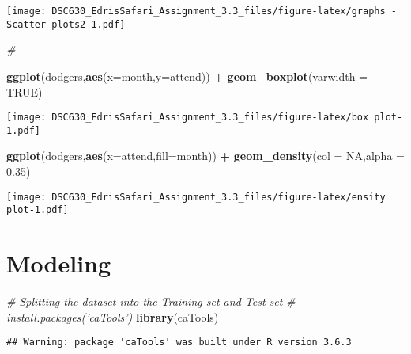 \documentclass[
]{article}
\newenvironment{Shaded}{\begin{snugshade}}{\end{snugshade}}
\newcommand{\CommentTok}[1]{\textcolor[rgb]{0.56,0.35,0.01}{\textit{#1}}}
\newcommand{\DataTypeTok}[1]{\textcolor[rgb]{0.13,0.29,0.53}{#1}}
\newcommand{\FloatTok}[1]{\textcolor[rgb]{0.00,0.00,0.81}{#1}}
\newcommand{\KeywordTok}[1]{\textcolor[rgb]{0.13,0.29,0.53}{\textbf{#1}}}
\newcommand{\NormalTok}[1]{#1}
\newcommand{\OperatorTok}[1]{\textcolor[rgb]{0.81,0.36,0.00}{\textbf{#1}}}
\newcommand{\OtherTok}[1]{\textcolor[rgb]{0.56,0.35,0.01}{#1}}
\newcommand{\StringTok}[1]{\textcolor[rgb]{0.31,0.60,0.02}{#1}}
\begin{document}
\texttt{[image: DSC630\_EdrisSafari\_Assignment\_3.3\_files/figure-latex/graphs - Scatter plots2-1.pdf]}

\begin{Shaded}
\begin{Highlighting}[]
\CommentTok{# }


\KeywordTok{ggplot}\NormalTok{(dodgers,}\KeywordTok{aes}\NormalTok{(}\DataTypeTok{x=}\NormalTok{month,}\DataTypeTok{y=}\NormalTok{attend)) }\OperatorTok{+}
\StringTok{  }\KeywordTok{geom_boxplot}\NormalTok{(}\DataTypeTok{varwidth =} \OtherTok{TRUE}\NormalTok{)}
\end{Highlighting}
\end{Shaded}

\texttt{[image: DSC630\_EdrisSafari\_Assignment\_3.3\_files/figure-latex/box plot-1.pdf]}

\begin{Shaded}
\begin{Highlighting}[]
\KeywordTok{ggplot}\NormalTok{(dodgers,}\KeywordTok{aes}\NormalTok{(}\DataTypeTok{x=}\NormalTok{attend,}\DataTypeTok{fill=}\NormalTok{month)) }\OperatorTok{+}
\StringTok{  }\KeywordTok{geom_density}\NormalTok{(}\DataTypeTok{col =} \OtherTok{NA}\NormalTok{,}\DataTypeTok{alpha =} \FloatTok{0.35}\NormalTok{)}
\end{Highlighting}
\end{Shaded}

\texttt{[image: DSC630\_EdrisSafari\_Assignment\_3.3\_files/figure-latex/ensity plot-1.pdf]}

\hypertarget{modeling}{%
\section{Modeling}\label{modeling}}

\begin{Shaded}
\begin{Highlighting}[]
\CommentTok{# Splitting the dataset into the Training set and Test set}
\CommentTok{# install.packages('caTools')}
\KeywordTok{library}\NormalTok{(caTools)}
\end{Highlighting}
\end{Shaded}

\begin{verbatim}
## Warning: package 'caTools' was built under R version 3.6.3
\end{verbatim}
\end{document}
